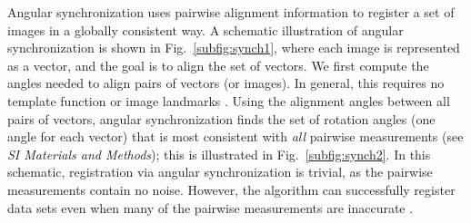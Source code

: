 \documentclass{pnastwo}
\newcommand{\fig}[0]{Fig.}
\begin{document}
\begin{article}
Angular synchronization uses pairwise alignment information to register a set of images in a globally consistent way.
%
A schematic illustration of angular synchronization is shown in \fig~\ref{subfig:synch1}, where each image is represented as a vector, and the goal is to align the set of vectors.
%
We first compute the angles needed to align pairs of vectors (or images).  
%
In general, this requires no template function \cite{ahuja2007template} or image landmarks \cite{ian1998statistical}.
%
Using the alignment angles between all pairs of vectors, angular synchronization finds the set of rotation angles (one angle for each vector) that is most consistent with {\it all} pairwise measurements (see {\it SI Materials and Methods}); this is illustrated in \fig~\ref{subfig:synch2}.
%
In this schematic, registration via angular synchronization is trivial, as the pairwise measurements contain no noise.
%
However, the algorithm can successfully register data sets even when many of the pairwise measurements are inaccurate \cite{singer2011angular}.
%


\end{article}
\end{document}
